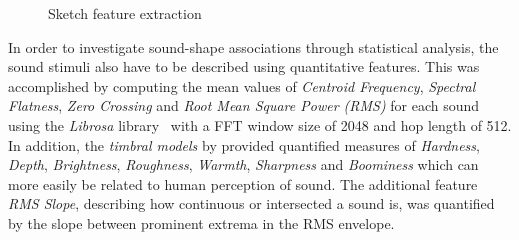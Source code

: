 \documentclass[]{interact}
\theoremstyle{plain}%
\theoremstyle{definition}
\theoremstyle{remark}
\begin{document}
\begin{figure}[h]
    \centering
     \hfill
    \hfill
    \caption{Sketch feature extraction}
    \label{fig:sketchfeatures}
\end{figure}


In order to investigate sound-shape associations through statistical analysis, the sound stimuli also have to be described using quantitative features. This was accomplished by computing the mean values of \textit{Centroid Frequency}, \textit{Spectral Flatness}, \textit{Zero Crossing} and \textit{Root Mean Square Power (RMS)} for each sound using the \textit{Librosa} library~\cite{librosa} with a FFT window size of 2048 and hop length of 512. In addition, the \textit{timbral models} by  provided quantified measures of \textit{Hardness}, \textit{Depth}, \textit{Brightness}, \textit{Roughness}, \textit{Warmth}, \textit{Sharpness} and \textit{Boominess} which can more easily be related to human perception of sound. The additional feature \textit{RMS Slope}, describing how continuous or intersected a sound is, was quantified by the slope between prominent extrema in the RMS envelope.
\end{document}
